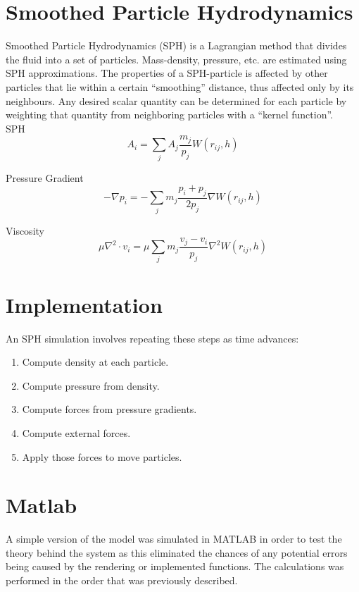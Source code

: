 \documentclass[a4paper,12pt,twoside]{report}
\begin{document}
\section{Smoothed Particle Hydrodynamics}
Smoothed Particle Hydrodynamics (SPH) is a Lagrangian method that divides the fluid into a set of particles. Mass-density, pressure, etc. are estimated using SPH approximations. The properties of a SPH-particle is affected by other particles that lie within a certain “smoothing” distance, thus affected only by its neighbours. Any desired scalar quantity can be determined for each particle by weighting that quantity from neighboring particles with a “kernel function”. \\

SPH
\begin{equation}
{A_i} = {\sum_j A_j} \frac{m_j}{p_j} {W(r_{ij},h)}
\label{e2}
\end{equation}

Pressure Gradient
\begin{equation}
{-\nabla p_i} =  {-\sum_j}{m_j}\frac{p_i + p_j}{2p_j}{\nabla W(r_{ij},h)}
\label{e3}
\end{equation}

Viscosity
\begin{equation}
{\mu \nabla^2 \cdot v_i} = {\mu}{\sum_j}{m_j}\frac{v_j - v_i}{p_j}{\nabla^2 W(r_{ij},h)}
\label{e4}
\end{equation}


\section{Implementation}
An SPH simulation involves repeating these steps as time advances:
\begin{enumerate}
\item Compute density at each particle.
\item Compute pressure from density.
\item Compute forces from pressure gradients.
\item Compute external forces.
\item Apply those forces to move particles.
\end{enumerate}

\section{Matlab}
A simple version of the model was simulated in MATLAB in order to test the theory behind the system as this eliminated the chances of any potential errors being caused by the rendering or implemented functions. The calculations was performed in the order that was previously described.
\end{document}
